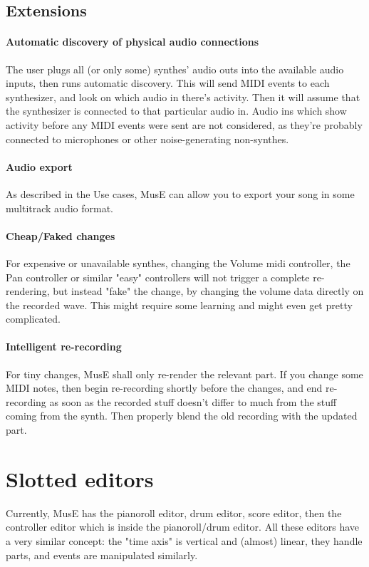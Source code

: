 \documentclass[a4paper]{report}
\begin{document}
\subsection{Extensions}
\paragraph{Automatic discovery of physical audio connections}
The user plugs all (or only some) synthes' audio outs into the available
audio inputs, then runs automatic discovery. This will send MIDI events
to each synthesizer, and look on which audio in there's activity. Then
it will assume that the synthesizer is connected to that particular
audio in. Audio ins which show activity before any MIDI events were
sent are not considered, as they're probably connected to microphones
or other noise-generating non-synthes.

\paragraph{Audio export}
As described in the Use cases, MusE can allow you to export your song
in some multitrack audio format.

\paragraph{Cheap/Faked changes}
For expensive or unavailable synthes, changing the Volume midi controller,
the Pan controller or similar "easy" controllers will not trigger a
complete re-rendering, but instead "fake" the change, by changing
the volume data directly on the recorded wave. This might require some
learning and might even get pretty complicated.

\paragraph{Intelligent re-recording}
For tiny changes, MusE shall only re-render the relevant part. If you
change some MIDI notes, then begin re-recording shortly before the
changes, and end re-recording as soon as the recorded stuff doesn't
differ to much from the stuff coming from the synth. Then properly
blend the old recording with the updated part.



\section{Slotted editors}
Currently, MusE has the pianoroll editor, drum editor, score editor,
then the controller editor which is inside the pianoroll/drum editor.
All these editors have a very similar concept: the "time axis" is
vertical and (almost) linear, they handle parts, and events are
manipulated similarly.
\end{document}
